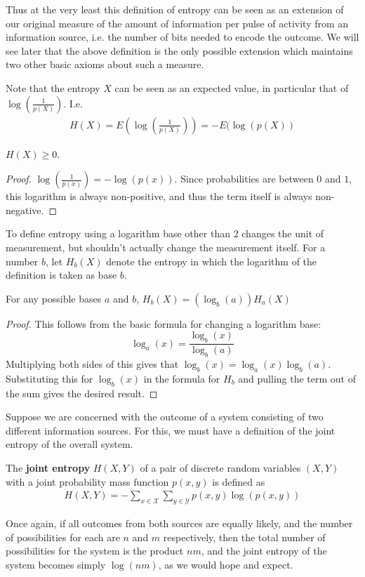 Thus at the very least this definition of entropy can be seen as an extension of our original measure of the amount of information per pulse of activity from an information source, i.e. the number of bits needed to encode the outcome. We will see later that the above definition is the only possible extension which maintains two other basic axioms about such a measure. \par 
Note that the entropy $X$ can be seen as an expected value, in particular that of $\log(\frac{1}{p(X)})$. I.e.
\begin{align}
	H(X) = E\left(\log\left(\frac{1}{p(X)}\right)\right) = -E(\log(p(X))
\end{align}
\begin{lemma}
	$H(X) \geq 0$.
\end{lemma}
\begin{proof}
	$\log(\frac{1}{p(x)}) = -\log(p(x))$. Since probabilities are between $0$ and $1$, this logarithm is always non-positive, and thus the term itself is always non-negative. 
\end{proof}
To define entropy using a logarithm base other than $2$ changes the unit of measurement, but shouldn't actually change the measurement itself. For a number $b$, let $H_b(X)$ denote the entropy in which the logarithm of the definition is taken as base $b$. 
\begin{lemma}	
	For any possible bases $a$ and $b$, $H_b(X) = (\log_b(a))H_a(X)$
\end{lemma}
\begin{proof}
	This follows from the basic formula for changing a logarithm base: 
	\[ \log_a(x) = \frac{\log_b(x)}{\log_b(a)} \]
	Multiplying both sides of this gives that $\log_b(x) = \log_a(x)\log_b(a)$. Substituting this for $\log_b(x)$ in the formula for $H_b$ and pulling the term out of the sum gives the desired result. 
\end{proof}
Suppose we are concerned with the outcome of a system consisting of two different information sources. For this, we must have a definition of the joint entropy of the overall system.
\begin{definition}
	The \textbf{joint entropy} $H(X,Y)$ of a pair of discrete random variables $(X,Y)$ with a joint probability mass function $p(x,y)$ is defined as 
	\begin{align}
		H(X,Y) = -\sum_{x \in \mathcal{X}} \sum_{y \in \mathcal{Y}} p(x,y)\log(p(x,y))
	\end{align}
\end{definition}
Once again, if all outcomes from both sources are equally likely, and the number of possibilities for each are $n$ and $m$ respectively, then the total number of possibilities for the system is the product $nm$, and the joint entropy of the system becomes simply $\log(nm)$, as we would hope and expect. \par 
